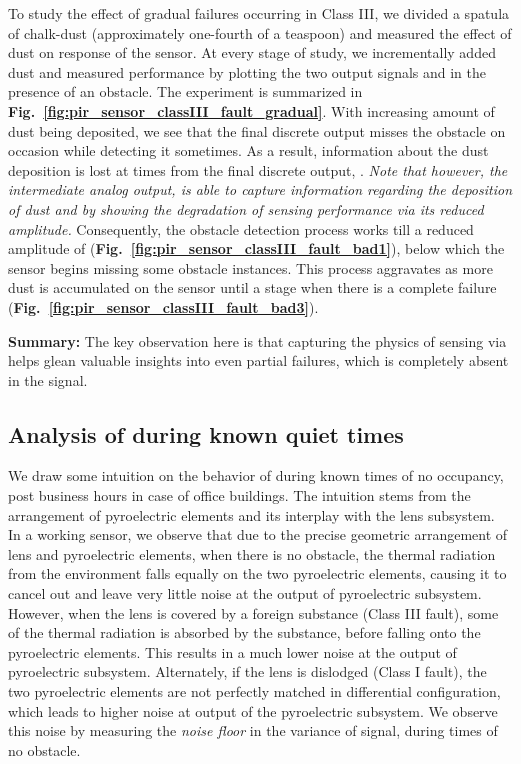 To study the effect of gradual failures occurring in Class III, we divided a spatula of chalk-dust (approximately one-fourth of a teaspoon) and measured the effect of dust on response of the sensor. At every stage of study, we incrementally added dust and measured performance by plotting the two output signals \cout and \aout in the presence of an obstacle. The experiment is summarized in {\bfseries Fig.~\ref{fig:pir_sensor_classIII_fault_gradual}}. With increasing amount of dust being deposited, we see that the final discrete output misses the obstacle on occasion while detecting it sometimes. As a result, information about the dust deposition is lost at times from the final discrete output, \cout. \textit{Note that however, the intermediate analog output, \aout is able to capture information regarding the deposition of dust and by showing the degradation of sensing performance via its reduced amplitude.} Consequently, the obstacle detection process works till a reduced amplitude of \aout ({\bfseries Fig.~\ref{fig:pir_sensor_classIII_fault_bad1}}), below which the sensor begins missing some obstacle instances. This process aggravates as more dust is accumulated on the sensor until a stage when there is a complete failure ({\bfseries Fig.~\ref{fig:pir_sensor_classIII_fault_bad3}}).

\noindent \textbf{Summary:} The key observation here is that capturing the physics of sensing via \aout helps glean valuable insights into even partial failures, which is completely absent in the \cout signal.


\subsection{Analysis of \aout during known quiet times} \label{subsec:aout_quiet_times} We draw some intuition on the behavior of \aout during known times of no occupancy, \eg post business hours in case of office buildings. The intuition stems from the arrangement of pyroelectric elements and its interplay with the lens subsystem. In a working sensor, we observe that due to the precise geometric arrangement of lens and pyroelectric elements, when there is no obstacle, the thermal radiation from the environment falls equally on the two pyroelectric elements, causing it to cancel out and leave very little noise at the output of pyroelectric subsystem. However, when the lens is covered by a foreign substance (\ie Class III fault), some of the thermal radiation is absorbed by the substance, before falling onto the pyroelectric elements. This results in a much lower noise at the output of pyroelectric subsystem. Alternately, if the lens is dislodged (\ie Class I fault), the two pyroelectric elements are not perfectly matched in differential configuration, which leads to higher noise at output of the pyroelectric subsystem. We observe this noise by measuring the \textit{noise floor} in the variance of \aout signal, during times of no obstacle.

